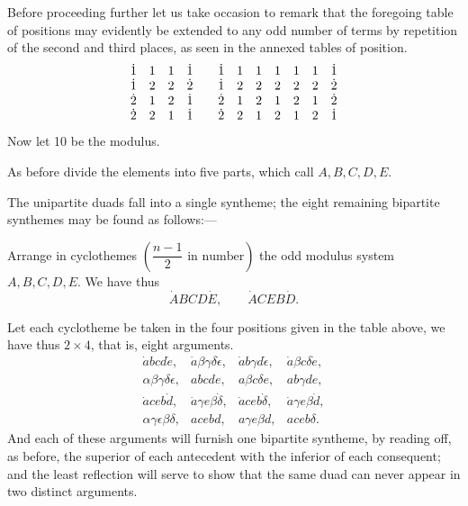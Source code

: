 \documentclass[11pt]{article}
\newcommand{\sourcepage}[1]{\marginpar{\scriptsize p.~#1}}
\newcommand{\dotter}[1]{\dot{#1}}
\begin{document}
Before proceeding further let us take occasion to remark that the foregoing table of positions may evidently be extended to any odd number of terms by repetition of the second and third places, as seen in the annexed tables of position.
\[
\begin{array}{llll@{\qquad}lllllll}
\dotter1&1&1&\dotter1&\dotter1&1&1&1&1&1&\dotter1\\
\dotter1&2&2&\dotter2&\dotter1&2&2&2&2&2&\dotter2\\
\dotter2&1&2&\dotter1&\dotter2&1&2&1&2&1&\dotter2\\
\dotter2&2&1&\dotter1&\dotter2&2&1&2&1&2&\dotter1
\end{array}
\]
Now let 10 be the modulus.

As before divide the elements into five parts, which call $A,B,C,D,E$.

The unipartite duads fall into a single syntheme; the eight remaining bipartite synthemes may be found as follows:---

Arrange in cyclothemes $\left(\dfrac{n-1}{2}\text{ in number}\right)$ the odd modulus system $A,B,C,D,E$. We have thus
\[
\dotter A B C D\dotter E,
\qquad
\dotter A C E B\dotter D.
\]

\sourcepage{96}
Let each cyclotheme be taken in the four positions given in the table above, we have thus $2\times4$, that is, eight arguments.
\[
\begin{array}{llll}
\dotter a b c d\dotter e,& \dotter a\beta\gamma\delta\dotter\epsilon,& \dotter a b\gamma d\dotter\epsilon,& \dotter a\beta c\delta\dotter e,\\
\alpha\beta\gamma\delta\epsilon,& abcde,& a\beta c\delta e,& ab\gamma d e,\\
\dotter a c e b\dotter d,& \dotter a\gamma e\beta\dotter\delta,& \dotter a c e b\dotter\delta,& \dotter a\gamma e\beta\dotter d,\\
\alpha\gamma\epsilon\beta\delta,& acebd,& a\gamma e\beta d,& aceb\delta.
\end{array}
\]
And each of these arguments will furnish one bipartite syntheme, by reading off, as before, the superior of each antecedent with the inferior of each consequent; and the least reflection will serve to show that the same duad can never appear in two distinct arguments.
\end{document}
